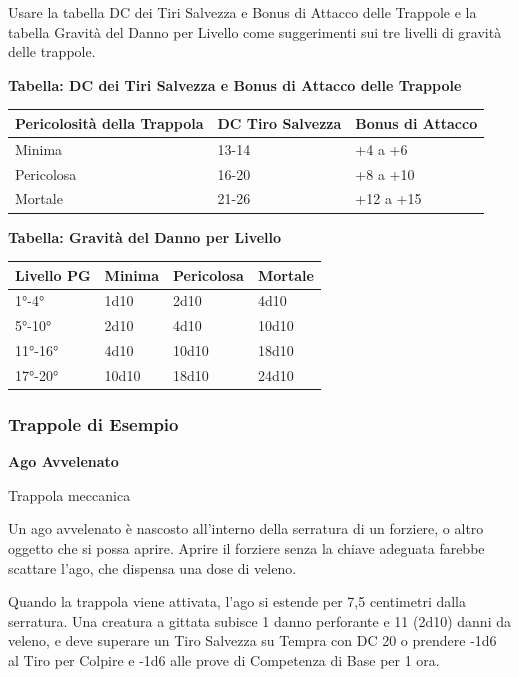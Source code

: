 \begin{multicols}{2}
Usare la tabella DC dei Tiri Salvezza e Bonus di Attacco delle Trappole e la tabella Gravità del Danno per Livello come suggerimenti sui tre livelli di gravità delle trappole.

\medskip

\textbf{Tabella: DC dei Tiri Salvezza e Bonus di Attacco delle Trappole}

\medskip

\noindent\begin{tabularx}{0.48\textwidth}{X|X|X}
Pericolosità della Trappola&DC Tiro Salvezza& Bonus di Attacco\\
\toprule
Minima&13-14&+4 a +6\\
Pericolosa&16-20&+8 a +10\\
Mortale&21-26&+12 a +15
\end{tabularx}

\medskip

\textbf{Tabella: Gravità del Danno per Livello}

\medskip

\noindent\begin{tabularx}{0.48\textwidth}{X|X|X|X}
Livello PG&Minima&Pericolosa&Mortale\\
\toprule
1°-4°&1d10&2d10&4d10\\
5°-10°&2d10&4d10&10d10\\
11°-16°&4d10&10d10&18d10\\
17°-20°&10d10&18d10&24d10
\end{tabularx}

\medskip

\subsubsection{Trappole di Esempio}\hypertarget{trappoleesempio}{}\label{trappoleesempio}
\textbf{Ago Avvelenato}

Trappola meccanica

Un ago avvelenato è nascosto all'interno della serratura di un forziere, o altro oggetto che si possa aprire. Aprire il forziere senza la chiave adeguata farebbe scattare l'ago, che dispensa una dose di veleno.

Quando la trappola viene attivata, l'ago si estende per 7,5 centimetri dalla serratura. Una creatura a gittata subisce 1 danno perforante e 11 (2d10) danni da veleno, e deve superare un Tiro Salvezza su Tempra con DC 20 o prendere -1d6 al Tiro per Colpire e -1d6 alle prove di Competenza di Base per 1 ora.


\end{multicols}
